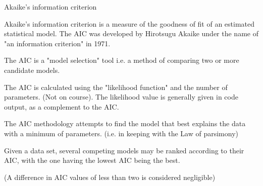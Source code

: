 
Akaike's information criterion 

Akaike's information criterion is a measure of the goodness of fit of an estimated statistical model. The AIC was developed by Hirotsugu Akaike under the name of "an information criterion" in 1971.

The AIC is a "model selection" tool i.e. a method of comparing two or more candidate models.

The AIC is calculated using the "likelihood function" and the number of parameters. (Not on course). The likelihood value is generally given in code output, as a complement to the AIC.


The AIC methodology attempts to find the model that best explains the data with a minimum of parameters. (i.e. in keeping with the Law of parsimony)

Given a data set, several competing models may be ranked according to their AIC, with the one having the lowest AIC being the best.

(A difference in AIC values of less than two is considered negligible)
